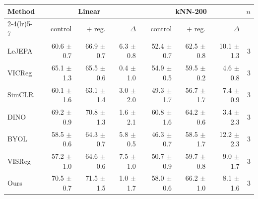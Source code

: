 

\begin{tabular}{lrrrrrrr}
\toprule
Method & \multicolumn{3}{c}{Linear} & \multicolumn{3}{c}{kNN-200} & $n$ \\
\cmidrule(lr){2-4}\cmidrule(lr){5-7}
 & control & + reg. & $\Delta$ & control & + reg. & $\Delta$ & \\
\midrule
LeJEPA & 60.6 $\pm$ 0.7 & 66.9 $\pm$ 0.7 & 6.3 $\pm$ 0.8 & 52.4 $\pm$ 0.7 & 62.5 $\pm$ 0.8 & 10.1 $\pm$ 1.3 & 3 \\
VICReg & 65.1 $\pm$ 1.3 & 65.5 $\pm$ 0.6 & 0.4 $\pm$ 1.0 & 54.9 $\pm$ 0.5 & 59.5 $\pm$ 0.2 & 4.6 $\pm$ 0.8 & 3 \\
SimCLR & 60.1 $\pm$ 1.6 & 63.1 $\pm$ 1.4 & 3.0 $\pm$ 2.0 & 49.3 $\pm$ 1.7 & 56.7 $\pm$ 1.7 & 7.4 $\pm$ 0.9 & 3 \\
DINO & 69.2 $\pm$ 0.9 & 70.8 $\pm$ 1.3 & 1.6 $\pm$ 2.1 & 60.8 $\pm$ 1.6 & 64.2 $\pm$ 0.6 & 3.4 $\pm$ 2.3 & 3 \\
BYOL & 58.5 $\pm$ 0.6 & 64.3 $\pm$ 0.7 & 5.8 $\pm$ 0.5 & 46.3 $\pm$ 0.7 & 58.5 $\pm$ 1.7 & 12.2 $\pm$ 2.3 & 3 \\
VISReg & 57.2 $\pm$ 1.0 & 64.6 $\pm$ 0.6 & 7.5 $\pm$ 1.0 & 50.7 $\pm$ 0.9 & 59.7 $\pm$ 0.8 & 9.0 $\pm$ 1.7 & 3 \\
Ours & 70.5 $\pm$ 0.7 & 71.5 $\pm$ 1.5 & 1.0 $\pm$ 1.7 & 58.0 $\pm$ 0.6 & 66.2 $\pm$ 1.0 & 8.1 $\pm$ 1.6 & 3 \\
\bottomrule
\end{tabular}